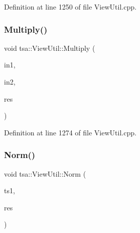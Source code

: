 Definition at line 1250 of file View\+Util.\+cpp.

\mbox{\label{classtsa_1_1_view_util_adb65d5e06f5ed0bec2bad29ca314aefc}} 
\subsubsection{\texorpdfstring{Multiply()}{Multiply()}\hspace{0.1cm}{\footnotesize\ttfamily [3/3]}}
{\footnotesize\ttfamily void tsa\+::\+View\+Util\+::\+Multiply (\begin{DoxyParamCaption}\item[{\hyperlink{namespacetsa_ab32775c889b53c40fa83939f22372b75}{Seq\+View\+Complex} \&}]{in1,  }\item[{\hyperlink{namespacetsa_ab32775c889b53c40fa83939f22372b75}{Seq\+View\+Complex} \&}]{in2,  }\item[{\hyperlink{namespacetsa_ab32775c889b53c40fa83939f22372b75}{Seq\+View\+Complex} \&}]{res }\end{DoxyParamCaption})\hspace{0.3cm}{\ttfamily [static]}}



Definition at line 1274 of file View\+Util.\+cpp.

\mbox{\label{classtsa_1_1_view_util_a2db516bb45aff911805ac0e918235dec}} 
\subsubsection{\texorpdfstring{Norm()}{Norm()}}
{\footnotesize\ttfamily void tsa\+::\+View\+Util\+::\+Norm (\begin{DoxyParamCaption}\item[{\hyperlink{namespacetsa_ab32775c889b53c40fa83939f22372b75}{Seq\+View\+Complex} \&}]{ts1,  }\item[{\hyperlink{namespacetsa_ac599574bcc094eda25613724b8f3ca9e}{Seq\+View\+Double} \&}]{res }\end{DoxyParamCaption})\hspace{0.3cm}{\ttfamily [static]}}



